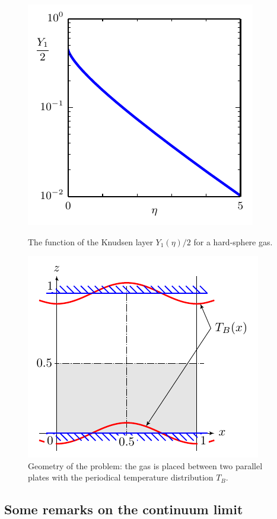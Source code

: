 \documentclass[smallextended, referee]{svjour3} %
\begin{document}
\begin{figure}[ht]
	\centering
	\begin{minipage}{.48\textwidth}
		\centering
		\includegraphics{Fig1}
		\caption{The function of the Knudsen layer \(Y_1(\eta)/2\) for a hard-sphere gas.}
		\label{fig:Y1}
	\end{minipage}
	\quad
	\begin{minipage}{.48\textwidth}
		\centering
		\includegraphics{Fig2}
		\vspace{13pt}
		\caption{Geometry of the problem: the gas is placed between two parallel plates
			with the periodical temperature distribution \(T_B\).}
		\label{fig:geometry}
	\end{minipage}
\end{figure}

\subsection{Some remarks on the continuum limit}
\end{document}
